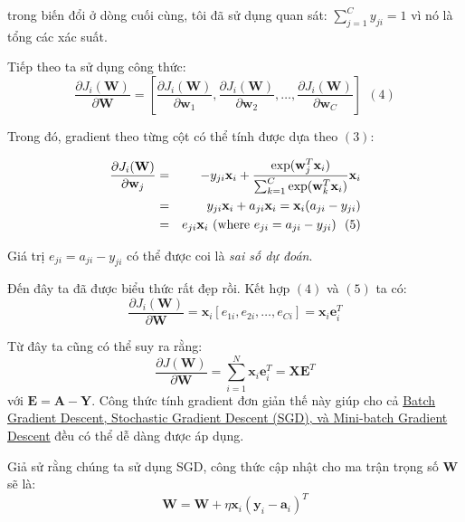 trong biến đổi ở dòng cuối cùng, tôi đã sử dụng quan sát: $\sum_{j=1}^C y_{ji} = 1$ vì nó là tổng các xác suất.  
 
Tiếp theo ta sử dụng công thức:  
\begin{equation*} 
\frac{\partial J_i(\mathbf{W})}{\partial \mathbf{W}} = \left[\frac{\partial J_i(\mathbf{W})}{\partial \mathbf{w}_1}, \frac{\partial J_i(\mathbf{W})}{\partial \mathbf{w}_2}, \dots, \frac{\partial J_i(\mathbf{W})}{\partial \mathbf{w}_C}    \right]~~(4) 
\end{equation*} 
 
Trong đó, gradient theo từng cột có thể tính được dựa theo $(3)$:  
 
\begin{eqnarray*}
\frac{\partial J_i(\mathbf{W})}{\partial \mathbf{w}_j} &=& -y_{ji}\mathbf{x}_i +  
\frac{\exp(\mathbf{w}_j^T\mathbf{x}_i)}{\sum_{k = 1}^C \exp(\mathbf{w}_k^T\mathbf{x}_i)}\mathbf{x}_i \\\ 
&=& \-y_{ji}\mathbf{x}_i + a_{ji} \mathbf{x}_i = \mathbf{x}_i (a_{ji} - y_{ji}) \\\ 
&=& e_{ji}\mathbf{x}_{i} ~(\text{where}~ e_{ji} = a_{ji} - y_{ji}) ~~(5) 
\end{eqnarray*}
 
Giá trị $e_{ji} = a_{ji} - y_{ji} $ có thể được coi là \textit{sai số dự đoán}. 
 
Đến đây ta đã được biểu thức rất đẹp rồi. Kết hợp $(4)$ và $(5)$ ta có:  
\begin{equation*} 
\frac{\partial J_i(\mathbf{W})}{\partial \mathbf{W}} = \mathbf{x}_i [e_{1i}, e_{2i}, \dots, e_{Ci}] = \mathbf{x}_i\mathbf{e}_i^T 
\end{equation*} 
 
Từ đây ta cũng có thể suy ra rằng: 
\begin{equation*} 
\frac{\partial J(\mathbf{W})}{\partial \mathbf{W}} = \sum_{i=1}^N \mathbf{x}_i\mathbf{e}_i^T = \mathbf{X}\mathbf{E}^T 
\end{equation*} 
với $\mathbf{E} = \mathbf{A - Y}$. Công thức tính gradient đơn giản thế này giúp cho cả \href{http://machinelearningcoban.com/2017/01/16/gradientdescent2/#-bien-the-cua-gradient-descent}{Batch Gradient Descent, Stochastic Gradient Descent (SGD), và Mini-batch Gradient Descent} đều có thể dễ dàng được áp dụng.  
 
Giả sử rằng chúng ta sử dụng SGD, công thức cập nhật cho ma trận trọng số $\mathbf{W}$ sẽ là:  
\begin{equation*} 
\mathbf{W} = \mathbf{W} +\eta \mathbf{x}_{i}(\mathbf{y}_i - \mathbf{a}_i)^T 
\end{equation*} 
 
